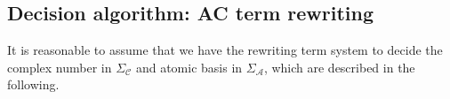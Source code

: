 \documentclass[manuscript, review, timestamp]{acmart}
\begin{document}




\subsection{Decision algorithm: AC term rewriting}
\label{sec: typed_dirac_rules}

It is reasonable to assume that we have the rewriting term system to decide the complex number in $\Sigma_\mathcal{C}$ and atomic basis in $\Sigma_\mathcal{A}$, which are described in the following.
\end{document}
